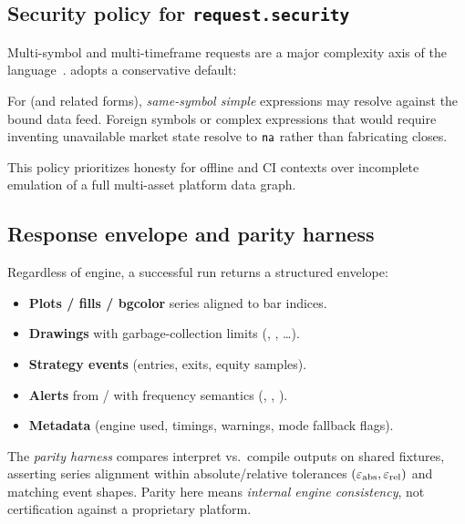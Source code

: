 \documentclass[11pt,a4paper]{article}
\begin{document}
\subsection{Security policy for \texttt{request.security}}
\label{sec:security-policy}

Multi-symbol and multi-timeframe requests are a major complexity axis of the
language~\citep{tradingview-pine}.
\pyne{} adopts a conservative default:

\begin{definition}
\label{def:security}
For  (and related forms), \emph{same-symbol simple
\ohlcv{}} expressions may resolve against the bound data feed.
Foreign symbols or complex expressions that would require inventing unavailable
market state resolve to $\textsf{na}$ rather than fabricating closes.
\end{definition}

This policy prioritizes honesty for offline and CI contexts over incomplete
emulation of a full multi-asset platform data graph.

\subsection{Response envelope and parity harness}
\label{sec:envelope}

Regardless of engine, a successful run returns a structured envelope:

\begin{itemize}[leftmargin=1.2em]
  \item \textbf{Plots / fills / bgcolor} series aligned to bar indices.
  \item \textbf{Drawings} with garbage-collection limits
    (, , \ldots).
  \item \textbf{Strategy events} (entries, exits, equity samples).
  \item \textbf{Alerts} from / with frequency
    semantics (, , ).
  \item \textbf{Metadata} (engine used, timings, warnings, mode fallback flags).
\end{itemize}

The \emph{parity harness} compares interpret vs.\ compile outputs on shared
fixtures, asserting series alignment within absolute/relative tolerances
$(\varepsilon_{\mathrm{abs}}, \varepsilon_{\mathrm{rel}})$ and matching event shapes.
Parity here means \emph{internal engine consistency}, not certification against
a proprietary platform.
\end{document}
